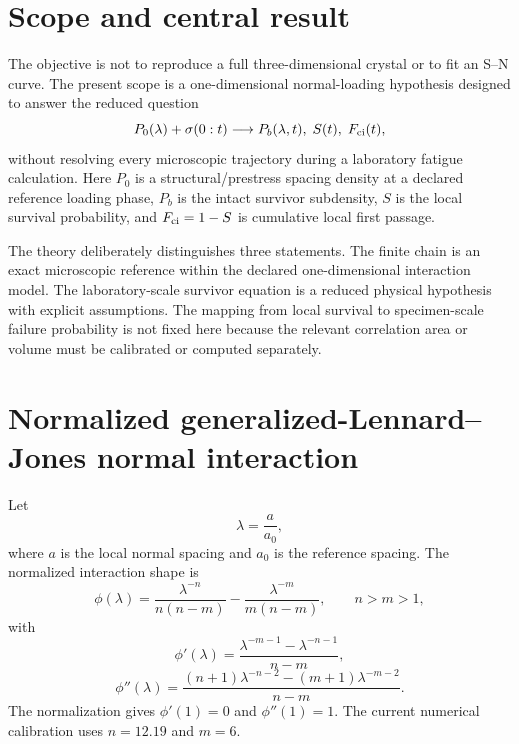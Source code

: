 \documentclass[11pt]{article}
\begin{document}
\section{Scope and central result}
The objective is not to reproduce a full three-dimensional crystal or to fit an S--N curve. The present scope is a one-dimensional normal-loading hypothesis designed to answer the reduced question
\begin{equation}
P_0(\lambda)+\sigma(0:t)
\longrightarrow
P_b(\lambda,t),\;S(t),\;F_{\rm ci}(t),
\label{eq:target}
\end{equation}
without resolving every microscopic trajectory during a laboratory fatigue calculation. Here $P_0$ is a structural/prestress spacing density at a declared reference loading phase, $P_b$ is the intact survivor subdensity, $S$ is the local survival probability, and $F_{\rm ci}=1-S$ is cumulative local first passage.

The theory deliberately distinguishes three statements. The finite chain is an exact microscopic reference within the declared one-dimensional interaction model. The laboratory-scale survivor equation is a reduced physical hypothesis with explicit assumptions. The mapping from local survival to specimen-scale failure probability is not fixed here because the relevant correlation area or volume must be calibrated or computed separately.

\section{Normalized generalized-Lennard--Jones normal interaction}
Let
\begin{equation}
\lambda=\frac{a}{a_0},
\end{equation}
where $a$ is the local normal spacing and $a_0$ is the reference spacing. The normalized interaction shape is
\begin{equation}
\phi(\lambda)
=\frac{\lambda^{-n}}{n(n-m)}
-\frac{\lambda^{-m}}{m(n-m)},
\qquad n>m>1,
\label{eq:phi}
\end{equation}
with
\begin{equation}
\phi'(\lambda)
=\frac{\lambda^{-m-1}-\lambda^{-n-1}}{n-m},
\end{equation}
\begin{equation}
\phi''(\lambda)
=\frac{(n+1)\lambda^{-n-2}-(m+1)\lambda^{-m-2}}{n-m}.
\label{eq:phipp}
\end{equation}
The normalization gives $\phi'(1)=0$ and $\phi''(1)=1$. The current numerical calibration uses $n=12.19$ and $m=6$.
\end{document}
